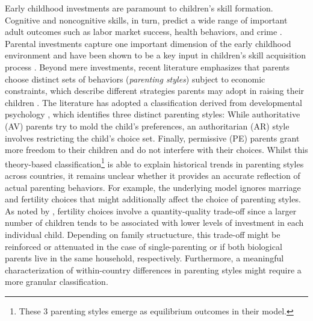 Early childhood investments are paramount to children's skill formation. Cognitive and noncognitive skills, in turn, predict a wide range of important adult outcomes such as labor market success, health behaviors, and crime \parencites[e.g.][]{heckmanEffectsCognitiveNoncognitive2006}{almlundPersonalityPsychologyEconomics2011}. Parental investments capture one important dimension of the early childhood environment and have been shown to be a key input in children's skill acquisition process \parencites[e.g.][]{falkSocioEconomicStatusInequalities2021}{attanasioEstimatingProductionFunction2020}. Beyond mere investments, recent literature emphasizes that parents choose distinct sets of behaviors (\textit{parenting styles}) subject to economic constraints, which describe different strategies parents may adopt in raising their children \parencites{doepkeParentingStyleAltruism2017}{doepkeEconomicsParenting2019}. The literature has adopted a classification derived from developmental psychology \parencite{baumrindChildCarePractices1967}, which identifies three distinct parenting styles: While authoritative (AV) parents try to mold the child's preferences, an authoritarian (AR) style involves restricting the child's choice set. Finally, permissive (PE) parents grant more freedom to their children and do not interfere with their choices. Whilst this theory-based classification\footnote{These 3 parenting styles emerge as equilibrium outcomes in their model.} is able to explain historical trends in parenting styles across countries, it remains unclear whether it provides an accurate reflection of actual parenting behaviors. For example, the underlying model ignores marriage and fertility choices that might additionally affect the choice of parenting styles. As noted by \textcite{beckerTreatiseFamily1981}, fertility choices involve a quantity-quality trade-off since a larger number of children tends to be associated with lower levels of investment in each individual child. Depending on family structucture, this trade-off might be reinforced or attenuated in the case of single-parenting or if both biological parents live in the same household, respectively. Furthermore, a meaningful characterization of within-country differences in parenting styles might require a more granular classification.

